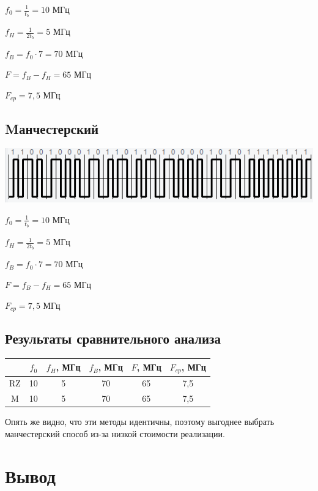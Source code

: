 $f_0 = \frac{1}{t_b} = 10$ МГц

$f_H = \frac{1}{2t_b} = 5$ МГц

$f_B = f_0 \cdot 7 = 70$ МГц

$F = f_B - f_H = 65$ МГц

$F_{cp} = 7,5$ МГц
\subsection{Mанчестерский}
\includegraphics[scale=0.7]{img/m_scra.png}

$f_0 = \frac{1}{t_b} = 10$ МГц

$f_H = \frac{1}{2t_b} = 5$ МГц

$f_B = f_0 \cdot 7 = 70$ МГц

$F = f_B - f_H = 65$ МГц

$F_{cp} = 7,5$ МГц
\subsection{Результаты сравнительного анализа}

\begin{table}[!h]
\begin{tabular}{|c|c|c|c|c|c|}
\hline
    & $f_0$ & $f_H$, МГц & $f_B$, МГц & $F$, МГц & $F_{cp}$, МГц \\ \hline
RZ  & 10    & 5          & 70         & 65       & 7,5           \\ \hline
M   & 10    & 5          & 70         & 65       & 7,5           \\ \hline
\end{tabular}
\end{table}
Опять же видно, что эти методы идентичны, поэтому выгоднее
выбрать манчестерский способ из-за низкой стоимости реализации.
\section{Вывод}

